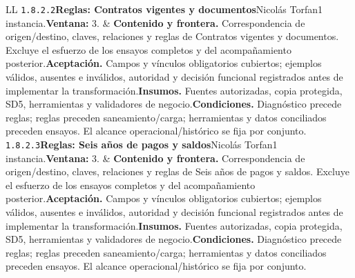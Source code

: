 \begin{longtable}{L{\tabcolsep\relax}L{\tabcolsep\relax}}
\texttt{1.\allowbreak{}8.\allowbreak{}2.\allowbreak{}2}\newline{}\textbf{Reglas: Contratos vigentes y documentos}\newline{}Nicolás Torfan\newline{}1 instancia.\newline{}\textbf{Ventana:} 3. & \textbf{Contenido y frontera.} Correspondencia de origen/destino, claves, relaciones y reglas de Contratos vigentes y documentos. Excluye el esfuerzo de los ensayos completos y del acompañamiento posterior.\newline{}\textbf{Aceptación.} Campos y vínculos obligatorios cubiertos; ejemplos válidos, ausentes e inválidos, autoridad y decisión funcional registrados antes de implementar la transformación.\newline{}\textbf{Insumos.} Fuentes autorizadas, copia protegida, SD5, herramientas y validadores de negocio.\newline{}\textbf{Condiciones.} Diagnóstico precede reglas; reglas preceden saneamiento/carga; herramientas y datos conciliados preceden ensayos. El alcance operacional/histórico se fija por conjunto.\\\hline
\texttt{1.\allowbreak{}8.\allowbreak{}2.\allowbreak{}3}\newline{}\textbf{Reglas: Seis años de pagos y saldos}\newline{}Nicolás Torfan\newline{}1 instancia.\newline{}\textbf{Ventana:} 3. & \textbf{Contenido y frontera.} Correspondencia de origen/destino, claves, relaciones y reglas de Seis años de pagos y saldos. Excluye el esfuerzo de los ensayos completos y del acompañamiento posterior.\newline{}\textbf{Aceptación.} Campos y vínculos obligatorios cubiertos; ejemplos válidos, ausentes e inválidos, autoridad y decisión funcional registrados antes de implementar la transformación.\newline{}\textbf{Insumos.} Fuentes autorizadas, copia protegida, SD5, herramientas y validadores de negocio.\newline{}\textbf{Condiciones.} Diagnóstico precede reglas; reglas preceden saneamiento/carga; herramientas y datos conciliados preceden ensayos. El alcance operacional/histórico se fija por conjunto.\\\hline

\end{longtable}
